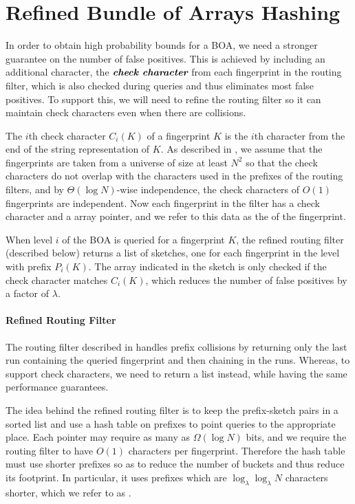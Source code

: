 \section{Refined Bundle of Arrays Hashing}\label{sec:boa-refined}

In order to obtain high probability bounds for a BOA, we need a stronger
guarantee on the number of false positives. This is achieved by including an
additional character, the $\emph{\textbf{\boldmath check character}}$ from each fingerprint in the
routing filter, which is also checked during queries and thus eliminates most
false positives.  To support this, we will need to refine the routing filter so
it can maintain check characters even when there are collisions.

The $i$th check character $C_i(K)$ of a fingerprint $K$ is the $i$th
character from the end of the string representation of $K$. As
described in , we assume that the fingerprints are
taken from a universe of size at least $N^2$ so that the check
characters do not overlap with the characters used in the prefixes of
the routing filters, and by $\Theta(\log N)$-wise independence, the
check characters of $O(1)$ fingerprints are independent. Now each
fingerprint in the filter has a check character and a array pointer,
and we refer to this data as the  of the fingerprint.

When level $i$ of the BOA is queried for a fingerprint $K$, the refined routing
filter (described below) returns a list of sketches, one for each fingerprint
in the level with prefix $P_i(K)$. The array indicated in the sketch is only
checked if the check character matches $C_i(K)$, which reduces the number of
false positives by a factor of $\lambda$.

\paragraph{Refined Routing Filter}
The routing filter described in  handles prefix
collisions by returning only the last run containing the queried fingerprint
and then chaining in the runs. Whereas, to support check characters, we need to
return a list instead, while having the same performance guarantees.

The idea behind the refined routing filter is to keep the prefix-sketch pairs
in a sorted list and use a hash table on prefixes to point queries to the
appropriate place. Each pointer may require as many as $\Omega(\log N)$ bits,
and we require the routing filter to have $O(1)$ characters per fingerprint.
Therefore the hash table must use shorter prefixes so as to reduce the number
of buckets and thus reduce its footprint. In particular, it uses prefixes which
are $\log_\lambda\log_\lambda N$ characters shorter, which we refer to as
.

